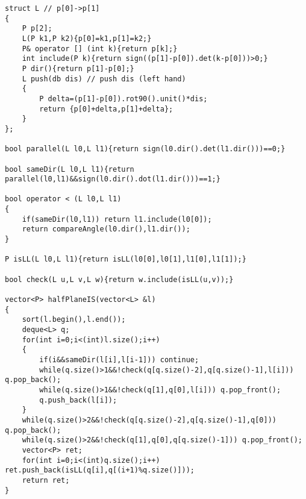 \begin{lstlisting}
struct L // p[0]->p[1]
{
    P p[2];
    L(P k1,P k2){p[0]=k1,p[1]=k2;}
    P& operator [] (int k){return p[k];}
    int include(P k){return sign((p[1]-p[0]).det(k-p[0]))>0;}
    P dir(){return p[1]-p[0];}
    L push(db dis) // push dis (left hand)
    {
        P delta=(p[1]-p[0]).rot90().unit()*dis;
        return {p[0]+delta,p[1]+delta};
    }
};

bool parallel(L l0,L l1){return sign(l0.dir().det(l1.dir()))==0;}

bool sameDir(L l0,L l1){return parallel(l0,l1)&&sign(l0.dir().dot(l1.dir()))==1;}

bool operator < (L l0,L l1)
{
    if(sameDir(l0,l1)) return l1.include(l0[0]);
    return compareAngle(l0.dir(),l1.dir());
}

P isLL(L l0,L l1){return isLL(l0[0],l0[1],l1[0],l1[1]);}

bool check(L u,L v,L w){return w.include(isLL(u,v));}

vector<P> halfPlaneIS(vector<L> &l)
{
    sort(l.begin(),l.end());
    deque<L> q;
    for(int i=0;i<(int)l.size();i++)
    {
        if(i&&sameDir(l[i],l[i-1])) continue;
        while(q.size()>1&&!check(q[q.size()-2],q[q.size()-1],l[i])) q.pop_back();
        while(q.size()>1&&!check(q[1],q[0],l[i])) q.pop_front();
        q.push_back(l[i]);
    }
    while(q.size()>2&&!check(q[q.size()-2],q[q.size()-1],q[0])) q.pop_back();
    while(q.size()>2&&!check(q[1],q[0],q[q.size()-1])) q.pop_front();
    vector<P> ret;
    for(int i=0;i<(int)q.size();i++) ret.push_back(isLL(q[i],q[(i+1)%q.size()]));
    return ret;
}
\end{lstlisting}